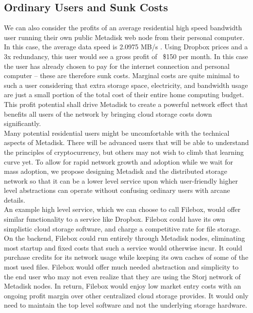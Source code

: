 \documentclass[a4paper,12pt]{article}
\begin{document}
\subsection*{Ordinary Users and Sunk Costs}

We can also consider the profits of an average residential high speed bandwidth user running their own public Metadisk web node from their personal computer. In this case, the average data speed is 2.0975 MB/s \cite{11}. Using Dropbox prices and a 3x redundancy, this user would see a gross profit of ~\$150 per month. In this case the user has already chosen to pay for the internet connection and personal computer -- these are therefore sunk costs. Marginal costs are quite minimal to such a user considering that extra storage space, electricity, and bandwidth usage are just a small portion of the total cost of their entire home computing budget.  This profit potential shall drive Metadisk to create a powerful network effect that benefits all users of the network by bringing cloud storage costs down significantly.\\
 
Many potential residential users might be uncomfortable with the technical aspects of  Metadisk. There will be advanced users that will be able to understand the principles of cryptocurrency, but others may not wish to climb that learning curve yet.  To allow for rapid network growth and adoption while we wait for mass adoption, we propose designing Metadisk and the distributed storage network so that it can be a lower level service upon which user-friendly higher level abstractions can operate without confusing ordinary users with arcane details.\\

An example high level service, which we can choose to call Filebox, would offer similar functionality to a service like Dropbox. Filebox could have its own simplistic cloud storage software, and charge a competitive rate for file storage. On the backend, Filebox could run entirely through Metadisk nodes, eliminating most startup and fixed costs that such a service would otherwise incur. It could purchase credits for its network usage while keeping its own caches of some of the most used files. Filebox would offer much needed abstraction and simplicity to the end user who may not even realize that they are using the Storj network of Metadisk nodes. In return, Filebox would enjoy low market entry costs with an ongoing profit margin over other centralized cloud storage provides. It would only need to maintain the top level software and not the underlying storage hardware.
\end{document}
